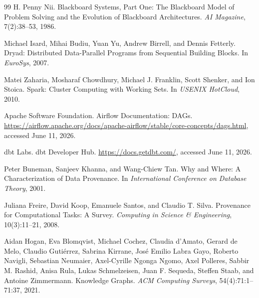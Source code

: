 \documentclass{article}
\begin{document}
\begin{thebibliography}{99}
H. Penny Nii.
\newblock Blackboard Systems, Part One: The Blackboard Model of Problem Solving and the Evolution of Blackboard Architectures.
\newblock \emph{AI Magazine}, 7(2):38--53, 1986.

Michael Isard, Mihai Budiu, Yuan Yu, Andrew Birrell, and Dennis Fetterly.
\newblock Dryad: Distributed Data-Parallel Programs from Sequential Building Blocks.
\newblock In \emph{EuroSys}, 2007.

Matei Zaharia, Mosharaf Chowdhury, Michael J. Franklin, Scott Shenker, and Ion Stoica.
\newblock Spark: Cluster Computing with Working Sets.
\newblock In \emph{USENIX HotCloud}, 2010.

Apache Software Foundation.
\newblock Airflow Documentation: DAGs.
\newblock \url{https://airflow.apache.org/docs/apache-airflow/stable/core-concepts/dags.html}, accessed June 11, 2026.

dbt Labs.
\newblock dbt Developer Hub.
\newblock \url{https://docs.getdbt.com/}, accessed June 11, 2026.

Peter Buneman, Sanjeev Khanna, and Wang-Chiew Tan.
\newblock Why and Where: A Characterization of Data Provenance.
\newblock In \emph{International Conference on Database Theory}, 2001.

Juliana Freire, David Koop, Emanuele Santos, and Claudio T. Silva.
\newblock Provenance for Computational Tasks: A Survey.
\newblock \emph{Computing in Science \& Engineering}, 10(3):11--21, 2008.

Aidan Hogan, Eva Blomqvist, Michael Cochez, Claudia d'Amato, Gerard de Melo, Claudio Guti\'errez, Sabrina Kirrane, Jos\'e Emilio Labra Gayo, Roberto Navigli, Sebastian Neumaier, Axel-Cyrille Ngonga Ngomo, Axel Polleres, Sabbir M. Rashid, Anisa Rula, Lukas Schmelzeisen, Juan F. Sequeda, Steffen Staab, and Antoine Zimmermann.
\newblock Knowledge Graphs.
\newblock \emph{ACM Computing Surveys}, 54(4):71:1--71:37, 2021.

\end{thebibliography}
\end{document}
